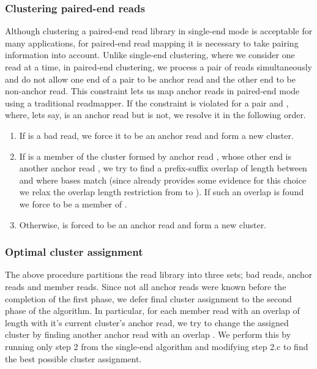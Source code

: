 \documentclass[a4paper]{article}
\begin{document}
\subsubsection{Clustering paired-end reads}
Although clustering a paired-end read library in single-end mode is
acceptable for many applications, for paired-end read mapping
it is necessary to take pairing information
into account.
Unlike single-end clustering, where we consider one read at a time,
in paired-end clustering, we process a pair of reads simultaneously
and do not allow one end of a pair to be anchor read and the other
end to be non-anchor read.
This constraint lets us map anchor reads in paired-end
mode using a traditional readmapper.
If the constraint is violated for a pair  and ,
where, lets say,  is an anchor read but  is not,
we resolve it in the following order.
\begin{enumerate}

\item If  is a bad read, we force it to be an anchor read and
form a new cluster.
\item If  is a member of the cluster formed by anchor read
, whose other end is another anchor read ,
we try to find a prefix-suffix overlap of length
 between  and  where
 bases match (since  already provides some evidence
for this choice we relax the overlap length restriction from
 to ).
If such an overlap is found we force
 to be a member of .
\item Otherwise,  is forced to be an anchor read and form a
new cluster.
\end{enumerate}


\subsubsection{Optimal cluster assignment}
The above procedure partitions the read library into three sets; bad reads, anchor
reads and member reads.
Since not all anchor reads were known before the completion of the first phase,
we defer final cluster assignment to the second phase of the algorithm.
In particular, for each member read  with an overlap of length 
with it's current cluster's anchor read, we try to change the
assigned cluster by finding another anchor read with an overlap .
We perform this by running only step 2 from the single-end algorithm
and modifying step 2.c to find the best possible cluster assignment.
\end{document}
